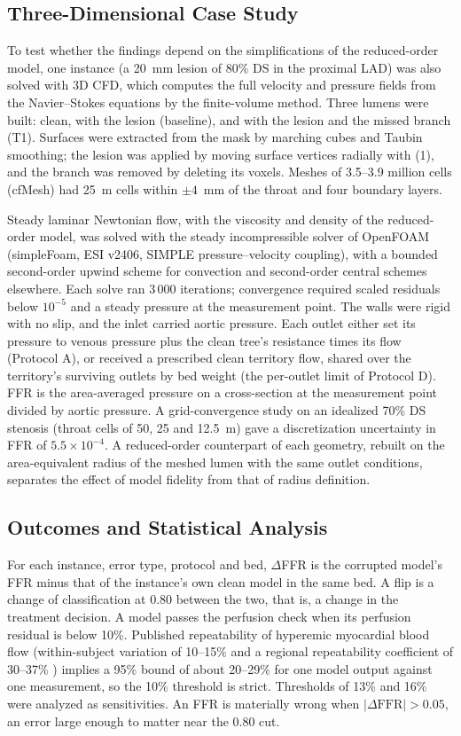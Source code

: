 \documentclass[journal,twoside,web]{ieeecolor}
\begin{document}
\subsection{Three-Dimensional Case Study}
To test whether the findings depend on the simplifications of the reduced-order model, one instance (a 20~mm lesion
of 80\% DS in the proximal LAD) was also solved with 3D CFD, which computes the full velocity and pressure fields
from the Navier--Stokes equations by the finite-volume method. Three lumens were built: clean, with the lesion (baseline), and with the
lesion and the missed branch (T1). Surfaces were extracted from the mask by marching cubes and Taubin smoothing; the
lesion was applied by moving surface vertices radially with (1), and the branch was removed by deleting its voxels.
Meshes of 3.5--3.9 million cells (cfMesh) had 25~\textmu m cells within $\pm 4$~mm of the throat and four boundary
layers.

Steady laminar Newtonian flow, with the viscosity and density of the reduced-order model, was solved with the
steady incompressible solver of OpenFOAM (simpleFoam, ESI v2406, SIMPLE pressure--velocity coupling), with a
bounded second-order upwind scheme for convection and second-order central schemes elsewhere. Each solve ran
3\,000 iterations; convergence required scaled residuals below $10^{-5}$ and a steady pressure at the measurement
point. The walls were rigid with no slip, and the inlet carried aortic pressure. Each outlet either set its pressure
to venous pressure plus the clean tree's resistance times its flow (Protocol A), or received a prescribed clean
territory flow, shared over the territory's surviving outlets by bed weight (the per-outlet limit of Protocol D). FFR
is the area-averaged pressure on a cross-section at the measurement point divided by aortic pressure. A
grid-convergence study on an idealized 70\% DS stenosis (throat cells of 50, 25 and 12.5~\textmu m) gave a
discretization uncertainty in FFR of $5.5\times10^{-4}$. A reduced-order counterpart of each geometry, rebuilt on the
area-equivalent radius of the meshed lumen with the same outlet conditions, separates the effect of model fidelity
from that of radius definition.

\subsection{Outcomes and Statistical Analysis}
For each instance, error type, protocol and bed, $\Delta$FFR is the corrupted model's FFR minus that of the
instance's own clean model in the same bed. A flip is a change of classification at 0.80 between the two, that is,
a change in the treatment decision. A model passes the perfusion check when its perfusion residual is below 10\%.
Published repeatability of hyperemic myocardial blood flow (within-subject variation of 10--15\%
\cite{schindler2023} and a regional repeatability coefficient of 30--37\% \cite{brown2018}) implies a 95\% bound of
about 20--29\% for one model output against one measurement, so the 10\% threshold is strict. Thresholds of 13\% and 16\% were analyzed as
sensitivities. An FFR is materially wrong when $|\Delta\mathrm{FFR}| > 0.05$, an error large enough to matter near
the 0.80 cut.
\end{document}
